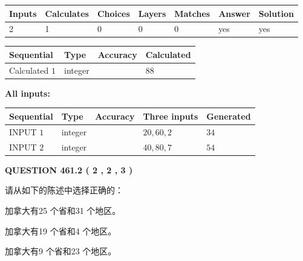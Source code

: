 \documentclass{ctexart}
\begin{document}
   
\noindent\begin{tabular}{|l|l|l|l|l|l|l|}
 \hline
Inputs & Calculates & Choices & Layers & Matches & Answer & Solution \\ \hline
 2  & 
 1  & 
 0
  & 
 0  & 
 0  & 
  yes & 
  yes 
  \\ \hline
 \end{tabular}
   
   
   
   
\noindent{}
   
   
  
  
\noindent\begin{tabular}{|l|l|l|l|}
\hline
 Sequential & Type & Accuracy & Calculated \\ 
\hline
 
 
  Calculated $  1 $ & integer &  & 
  $ 88 $ 
 \\  \hline  
 \end{tabular}
   
   
   
   
\noindent\vspace{0.1in}\hspace{-0.08in} {\textbf{\Large{All inputs: }}}
   
   
  
  
\noindent\begin{tabular}{|l|l|l|l|l|}
\hline
 Sequential & Type & Accuracy & Three inputs & Generated \\ 
\hline
 
 
  INPUT $  1 $ & integer &  & $
 20
 , 
 60
 , 
 2
 $ & $ 34 $ 
 \\  \hline  
 
 
  INPUT $  2 $ & integer &  & $
 40
 , 
 80
 , 
 7
 $ & $ 54 $ 
 \\  \hline  
 \end{tabular}
   
   
  
\vspace{0.2in}
  
{\textbf{\Large{QUESTION
461.2 
 ( 2 , 2 , 3 )
}}}
  
  
请从如下的陈述中选择正确的：
 
 
加拿大有25 个省和31 个地区。
 
 
加拿大有19 个省和4 个地区。
 
 
加拿大有9 个省和23 个地区。
 
\end{document}
